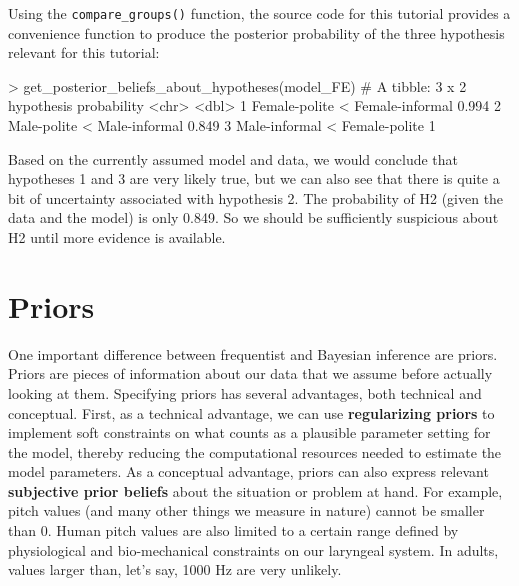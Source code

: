 \documentclass[nobib]{tufte-handout}
\begin{document}
Using the \texttt{compare\_groups()} function, the source code for this tutorial provides a
convenience function to produce the posterior probability of the three hypothesis relevant for
this tutorial: 

\medskip

\begin{minipage}[]{\textwidth}
\begin{rc}
> get_posterior_beliefs_about_hypotheses(model_FE)
# A tibble: 3 x 2
  hypothesis                      probability
  <chr>                                 <dbl>
1 Female-polite < Female-informal       0.994
2 Male-polite < Male-informal           0.849
3 Male-informal < Female-polite         1
\end{rc}
\end{minipage}

Based on the currently assumed model and data, we would conclude that hypotheses 1 and 3 are very likely true, but we can also see that there is quite a bit of uncertainty associated with hypothesis 2. The probability of H2 (given the data and the model) is only 0.849. So we should be sufficiently suspicious about H2 until more evidence is available.

%

\section{Priors}

One important difference between frequentist and Bayesian inference are priors. Priors are pieces of information about our data that we assume before actually looking at them. Specifying priors has several advantages, both technical and conceptual. First, as a technical advantage, we can use \textbf{regularizing priors} to implement soft constraints on what counts as a plausible parameter setting for the model, thereby reducing the computational resources needed to estimate the model parameters.
%
%
As a conceptual advantage, priors can also express relevant \textbf{subjective prior beliefs} about the situation or problem at hand. For example, pitch values (and many other things we measure in nature) cannot be smaller than 0. Human pitch values are also limited to a certain range defined by physiological and bio-mechanical constraints on our laryngeal system. In adults, values larger than, let's say, 1000 Hz are very unlikely. 
 
\end{document}
